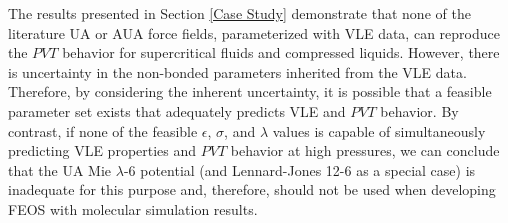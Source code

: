 \documentclass[journal=jctc,manuscript=article]{achemso}
\begin{document}
The results presented in Section \ref{Case Study} demonstrate that none of the literature UA or AUA force fields, parameterized with VLE data, can reproduce the $PVT$ behavior for supercritical fluids and compressed liquids. However, there is uncertainty in the non-bonded parameters inherited from the VLE data. Therefore, by considering the inherent uncertainty, it is possible that 
a feasible parameter set exists that adequately predicts VLE and $PVT$ behavior. By contrast, if none of the feasible $\epsilon$, $\sigma$, and $\lambda$ values is capable of simultaneously predicting VLE properties and $PVT$ behavior at high pressures, we can conclude that the UA Mie $\lambda$-6 potential (and Lennard-Jones 12-6 as a special case) is inadequate for this purpose and, therefore, should not be used when developing FEOS with molecular simulation results. 


\end{document}
